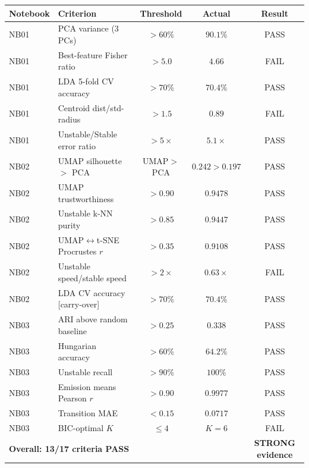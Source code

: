 \documentclass[12pt]{article}
\begin{document}
\begin{center}\begin{tabular}{llccc}\toprule
Notebook & Criterion & Threshold & Actual & Result \\ \midrule

NB01 & PCA variance (3 PCs) & $>60\%$ & $90.1\%$ & PASS \\
NB01 & Best-feature Fisher ratio & $>5.0$ & $4.66$ & FAIL \\
NB01 & LDA 5-fold CV accuracy & $>70\%$ & $70.4\%$ & PASS \\
NB01 & Centroid dist/std-radius & $>1.5$ & $0.89$ & FAIL \\
NB01 & Unstable/Stable error ratio & $>5\times$ & $5.1\times$ & PASS \\

\midrule

NB02 & UMAP silhouette $>$ PCA & UMAP$>$PCA & $0.242>0.197$ & PASS \\
NB02 & UMAP trustworthiness & $>0.90$ & $0.9478$ & PASS \\
NB02 & Unstable k-NN purity & $>0.85$ & $0.9447$ & PASS \\
NB02 & UMAP$\leftrightarrow$t-SNE Procrustes $r$ & $>0.35$ & $0.9108$ & PASS \\
NB02 & Unstable speed/stable speed & $>2\times$ & $0.63\times$ & FAIL \\
NB02 & LDA CV accuracy [carry-over] & $>70\%$ & $70.4\%$ & PASS \\

\midrule

NB03 & ARI above random baseline & $>0.25$ & $0.338$ & PASS \\
NB03 & Hungarian accuracy & $>60\%$ & $64.2\%$ & PASS \\
NB03 & Unstable recall & $>90\%$ & $100\%$ & PASS \\
NB03 & Emission means Pearson $r$ & $>0.90$ & $0.9977$ & PASS \\
NB03 & Transition MAE & $<0.15$ & $0.0717$ & PASS \\
NB03 & BIC-optimal $K$ & $\leq 4$ & $K=6$ & FAIL \\

\midrule
\multicolumn{4}{l}{\textbf{Overall: 13/17 criteria PASS}} & \textbf{STRONG evidence} \\
\bottomrule\end{tabular}\end{center}
\end{document}
